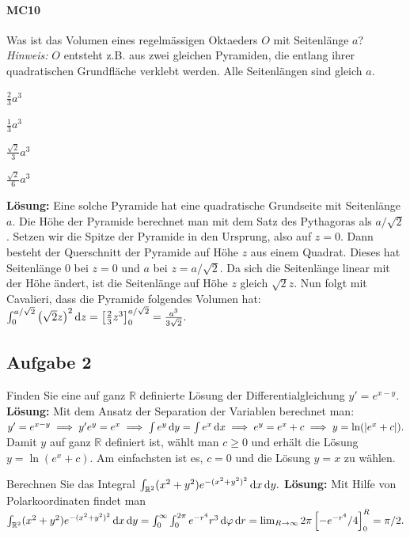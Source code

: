 \documentclass[a4paper,10pt]{article}
\def\R{\mathbb{R}}
\begin{document}
{\paragraph{MC10} Was ist das Volumen eines regelmässigen Oktaeders \( O \) mit Seitenlänge \( a \)? \textit{Hinweis:} \( O \) entsteht z.B. aus zwei gleichen Pyramiden, die entlang ihrer quadratischen Grundfläche verklebt werden. Alle Seitenlängen sind gleich \( a \).
\begin{enumerate*}
    \item \( \frac{2}{3} a^3 \)
    \item \( \frac{1}{3} a^3 \)
    \item \( \frac{\sqrt{2}}{3} a^3 \)
    \item \( \frac{\sqrt{2}}{6} a^3 \)
\end{enumerate*}
\textbf{Lösung:} Eine solche Pyramide hat eine quadratische Grundseite mit Seitenlänge \( a \). Die Höhe der Pyramide berechnet man mit dem Satz des Pythagoras als \( a / \sqrt{2} \). Setzen wir die Spitze der Pyramide in den Ursprung, also auf \( z = 0 \). Dann besteht der Querschnitt der Pyramide auf Höhe \( z \) aus einem Quadrat. Dieses hat Seitenlänge \( 0 \) bei \( z = 0 \) und \( a \) bei \( z = a / \sqrt{2} \). Da sich die Seitenlänge linear mit der Höhe ändert, ist die Seitenlänge auf Höhe \( z \) gleich \( \sqrt{2} z \). Nun folgt mit Cavalieri, dass die Pyramide folgendes Volumen hat:
\(
    \int_0^{a / \sqrt{2}} \left(\sqrt{2} z \right)^2 \odif{z} = \left[ \frac{2}{3} z^3 \right]_0^{a / \sqrt{2}} = \frac{a^3}{3 \sqrt{2}} \text{.}
\)

}


\subsection{Aufgabe 2}

Finden Sie eine auf ganz \( \R \) definierte Lösung der Differentialgleichung \( y' = e^{x - y} \).
\textbf{Lösung:} Mit dem Ansatz der Separation der Variablen berechnet man:
\(
    y' = e^{x - y} \implies y' e^y = e^x \implies \int e^y \odif{y} = \int e^x \odif{x} \implies e^y = e^x + c \implies y = \ln(\lvert e^x + c \rvert) \text{.}
\)
Damit \( y \) auf ganz \( \R \) definiert ist, wählt man \( c \geq 0 \) und erhält die Lösung \( y = \ln(e^x + c) \). Am einfachsten ist es, \( c = 0 \) und die Lösung \( y = x \) zu wählen.

Berechnen Sie das Integral
\(
    \int_{\R^2} (x^2 + y^2) e^{-(x^2 + y^2)^2} \odif{x, y} \text{.}
\)
\textbf{Lösung:} Mit Hilfe von Polarkoordinaten findet man
\(
    \int_{\R^2} (x^2 + y^2) e^{-(x^2 + y^2)^2} \odif{x, y} = \int_0^\infty \int_0^{2 \pi} e^{-r^4} r^3 \odif{\varphi, r} = \lim_{R \to \infty} 2 \pi \left[ -e^{-r^4} / 4 \right]_0^R = \pi / 2 \text{.}
\)
\end{document}
